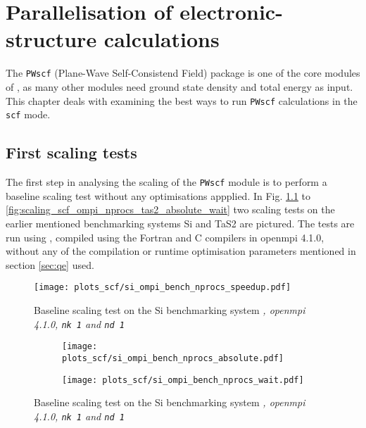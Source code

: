 \documentclass[main.tex]{subfiles}
\begin{document}
\chapter{Parallelisation of electronic-structure calculations\label{ch:optimisation_scf}}

The \texttt{PWscf} (Plane-Wave Self-Consistend Field) package is one of the core modules of \QE, as many other modules need ground state density and total energy as input.
This chapter deals with examining the best ways to run \texttt{PWscf} calculations in the \texttt{scf} mode.

\section{First scaling tests}\label{sec:scf_first_scaling}

The first step in analysing the scaling of the \texttt{PWscf} module is to perform a baseline scaling test without any optimisations appplied. 
In Fig. \ref{fig:scaling_scf_ompi_nprocs_si_speedup} to \ref{fig:scaling_scf_ompi_nprocs_tas2_absolute_wait} two scaling tests on the earlier mentioned benchmarking systems Si and TaS2 are pictured. 
The tests are run using , compiled using the Fortran and C compilers in \gls{openmpi} 4.1.0, without any of the compilation or runtime optimisation parameters mentioned in section \ref{sec:qe} used.

\begin{figure}[ht!]
\centering
\texttt{[image: plots\_scf/si\_ompi\_bench\_nprocs\_speedup.pdf]}
\caption{Baseline scaling test on the Si benchmarking system \emph{, \gls{openmpi} 4.1.0, \texttt{nk 1} and \texttt{nd 1}}}
\label{fig:scaling_scf_ompi_nprocs_si_speedup}
\end{figure}

\begin{figure}[ht!]
\begin{subfigure}[b]{0.49\textwidth}
    \centering
    \texttt{[image: plots\_scf/si\_ompi\_bench\_nprocs\_absolute.pdf]}
\end{subfigure}
\begin{subfigure}[b]{0.49\textwidth}
    \centering
    \texttt{[image: plots\_scf/si\_ompi\_bench\_nprocs\_wait.pdf]}
\end{subfigure}
\caption{Baseline scaling test on the Si benchmarking system \emph{, \gls{openmpi} 4.1.0, \texttt{nk 1} and \texttt{nd 1}}}
\label{fig:scaling_scf_ompi_nprocs_si_absolute_wait}
\end{figure}
\end{document}
